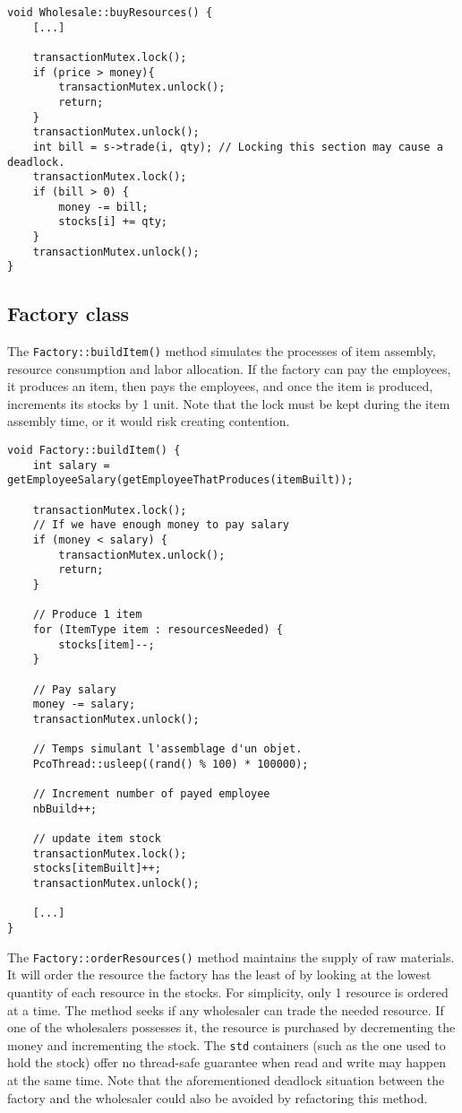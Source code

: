 \documentclass{article}
\begin{document}
    \begin{lstlisting}
void Wholesale::buyResources() {
    [...]

    transactionMutex.lock();
    if (price > money){
        transactionMutex.unlock();
        return;
    }
    transactionMutex.unlock();
    int bill = s->trade(i, qty); // Locking this section may cause a deadlock.
    transactionMutex.lock();
    if (bill > 0) {
        money -= bill;
        stocks[i] += qty;
    }
    transactionMutex.unlock();
}
    \end{lstlisting}

    \subsection{Factory class}

    The \texttt{Factory::buildItem()} method simulates the processes of item assembly, resource consumption and labor allocation.
    If the factory can pay the employees, it produces an item, then pays the employees, and once the item is produced,
    increments its stocks by 1 unit. Note that the lock must be kept during the item assembly time, or it would risk creating
    contention.

    \begin{lstlisting}
void Factory::buildItem() {
    int salary = getEmployeeSalary(getEmployeeThatProduces(itemBuilt));

    transactionMutex.lock();
    // If we have enough money to pay salary
    if (money < salary) {
        transactionMutex.unlock();
        return;
    }

    // Produce 1 item
    for (ItemType item : resourcesNeeded) {
        stocks[item]--;
    }

    // Pay salary
    money -= salary;
    transactionMutex.unlock();

    // Temps simulant l'assemblage d'un objet.
    PcoThread::usleep((rand() % 100) * 100000);

    // Increment number of payed employee
    nbBuild++;

    // update item stock
    transactionMutex.lock();
    stocks[itemBuilt]++;
    transactionMutex.unlock();

    [...]
}
    \end{lstlisting}

    The \texttt{Factory::orderResources()} method maintains the supply of raw materials. It will order the resource the factory
    has the least of by looking at the lowest quantity of each resource in the stocks. For simplicity, only 1 resource is
    ordered
    at a time. The method seeks if any wholesaler can trade the needed resource. If one of the wholesalers possesses it,
    the resource is purchased by decrementing the money and incrementing the stock. The \texttt{std} containers (such as the one
    used to hold the stock) offer no thread-safe guarantee when read and write may happen at the same time.
    Note that the aforementioned deadlock situation between the factory and the wholesaler could also be avoided by
    refactoring this method.
\end{document}

